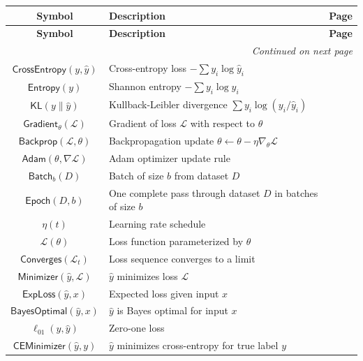\documentclass{amsart}
\newenvironment{glossarytable}{%
	\renewcommand{\arraystretch}{1.3}%
	\setlength{\tabcolsep}{4pt}%
	\begin{longtable}{|c|p{11cm}|c|}
		\hline
		\textbf{Symbol} & \textbf{Description} & \textbf{Page} \\
		\hline
		\endfirsthead
		\hline
		\textbf{Symbol} & \textbf{Description} & \textbf{Page} \\
		\hline
		\endhead
		\hline
		\multicolumn{3}{r}{\textit{Continued on next page}} \\
		\endfoot
		\hline
		\endlastfoot
}{%
	\end{longtable}%
}
\theoremstyle{break}
\begin{document}
\begin{glossarytable}
		$\mathsf{CrossEntropy}(y, \hat{y})$ & Cross-entropy loss $-\sum y_i \log \hat{y}_i$ & \pageref{def:cross-entropy} \\
		$\mathsf{Entropy}(y)$ & Shannon entropy $-\sum y_i \log y_i$ & \pageref{def:entropy} \\
		$\mathsf{KL}(y \| \hat{y})$ & Kullback-Leibler divergence $\sum y_i \log(y_i/\hat{y}_i)$ & \pageref{def:kl-divergence} \\
		$\mathsf{Gradient}_{\theta}(\mathcal{L})$ & Gradient of loss $\mathcal{L}$ with respect to $\theta$ & \pageref{def:gradient} \\
		$\mathsf{Backprop}(\mathcal{L}, \theta)$ & Backpropagation update $\theta \leftarrow \theta - \eta \nabla_{\theta} \mathcal{L}$ & \pageref{def:backpropagation} \\
		$\mathsf{Adam}(\theta, \nabla \mathcal{L})$ & Adam optimizer update rule & \pageref{def:adam-optimizer} \\
		$\mathsf{Batch}_b(D)$ & Batch of size $b$ from dataset $D$ & \pageref{def:batch} \\
		$\mathsf{Epoch}(D, b)$ & One complete pass through dataset $D$ in batches of size $b$ & \pageref{def:epoch} \\
		$\eta(t)$ & Learning rate schedule & \pageref{def:learning-rate-schedule} \\
		$\mathcal{L}(\theta)$ & Loss function parameterized by $\theta$ & \pageref{def:loss-function} \\
		$\mathsf{Converges}(\mathcal{L}_t)$ & Loss sequence converges to a limit & \pageref{def:convergence} \\
		
		$\mathsf{Minimizer}(\hat{y}, \mathcal{L})$ & $\hat{y}$ minimizes loss $\mathcal{L}$ & \pageref{def:minimizer} \\
		$\mathsf{ExpLoss}(\hat{y}, x)$ & Expected loss given input $x$ & \pageref{def:exp-loss} \\
		$\mathsf{BayesOptimal}(\hat{y}, x)$ & $\hat{y}$ is Bayes optimal for input $x$ & \pageref{def:bayes-optimal} \\
		$\ell_{01}(y, \hat{y})$ & Zero-one loss & \pageref{def:zero-one-loss} \\
		$\mathsf{CEMinimizer}(\hat{y}, y)$ & $\hat{y}$ minimizes cross-entropy for true label $y$ & \pageref{def:ce-minimizer} \\
		

\end{glossarytable}
\end{document}
